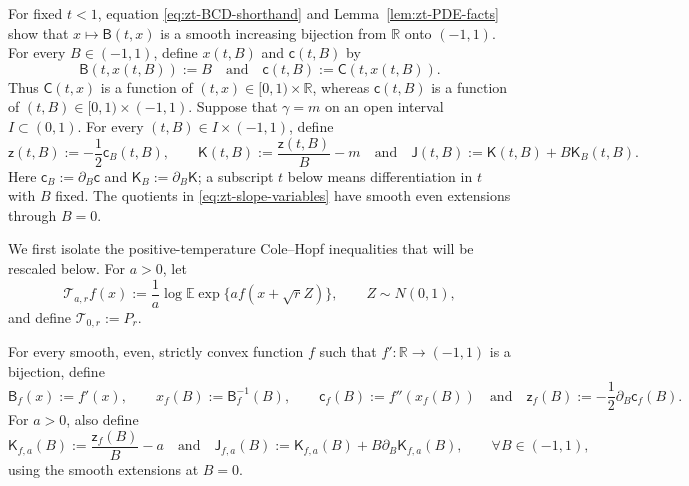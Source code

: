 \documentclass[10pt]{amsart}
\theoremstyle{definition}
\theoremstyle{remark}
\numberwithin{equation}{section}
\newcommand{\R}{\mathbb R}
\newcommand{\E}{\mathbb E}
\newcommand{\1}{\mathbf 1}
\begin{document}
For fixed $t<1$, equation \eqref{eq:zt-BCD-shorthand} and Lemma~\ref{lem:zt-PDE-facts} show that $x\mapsto\mathsf B(t,x)$ is a smooth increasing bijection from $\R$ onto $(-1,1)$. For every $B\in(-1,1)$, define $x(t,B)$ and $\mathsf c(t,B)$ by
\begin{equation}
 \mathsf B(t,x(t,B)):=B\quad\text{and}\quad \mathsf c(t,B):=\mathsf C(t,x(t,B)).
 \label{eq:zt-slope-curvature}
\end{equation}
Thus $\mathsf C(t,x)$ is a function of $(t,x)\in[0,1)\times\R$, whereas $\mathsf c(t,B)$ is a function of $(t,B)\in[0,1)\times(-1,1)$. Suppose that $\gamma=m$ on an open interval $I\subset(0,1)$. For every $(t,B)\in I\times(-1,1)$, define
\begin{equation}
 \mathsf z(t,B):=-\frac12\mathsf c_B(t,B),\qquad \mathsf K(t,B):=\frac{\mathsf z(t,B)}B-m
 \quad\text{and}\quad \mathsf J(t,B):=\mathsf K(t,B)+B\mathsf K_B(t,B).
 \label{eq:zt-slope-variables}
\end{equation}
Here $\mathsf c_B:=\partial_B\mathsf c$ and $\mathsf K_B:=\partial_B\mathsf K$; a subscript $t$ below means differentiation in $t$ with $B$ fixed. The quotients in \eqref{eq:zt-slope-variables} have smooth even extensions through $B=0$.

We first isolate the positive-temperature Cole--Hopf inequalities that will be rescaled below. For $a>0$, let
\begin{equation}
 \mathcal T_{a,r}f(x):=\frac1a\log\E
 \exp\{a f(x+\sqrt r Z)\},\qquad Z\sim N(0,1),
 \label{eq:zt-Cole-Hopf-operator}
\end{equation}
and define $\mathcal T_{0,r}:=P_r$.

For every smooth, even, strictly convex function $f$ such that $f':\R\to(-1,1)$ is a bijection, define
\begin{equation}
 \mathsf B_f(x):=f'(x),\qquad x_f(B):=\mathsf B_f^{-1}(B),\qquad \mathsf c_f(B):=f''(x_f(B))
 \quad\text{and}\quad \mathsf z_f(B):=-\frac12\partial_B\mathsf c_f(B).
 \label{eq:zt-finite-slope-variables}
\end{equation}
For $a>0$, also define
\begin{equation*}
 \mathsf K_{f,a}(B):=\frac{\mathsf z_f(B)}B-a
 \quad\text{and}\quad \mathsf J_{f,a}(B):=\mathsf K_{f,a}(B)+B\partial_B\mathsf K_{f,a}(B),
 \qquad \forall B\in(-1,1),
\end{equation*}
using the smooth extensions at $B=0$.
\end{document}
